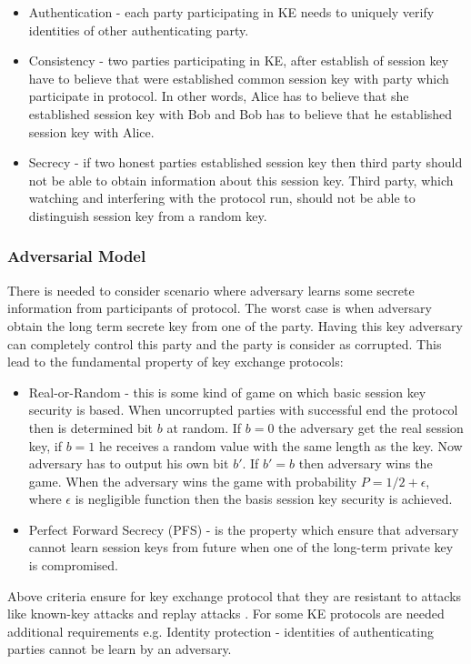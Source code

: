 \documentclass[11pt,titlepage]{article}
\theoremstyle{plain}
\begin{document}
\begin{itemize}
\item Authentication - each party participating in KE needs to uniquely verify identities of other authenticating party.
\item Consistency - two parties participating in KE, after establish of session key have to believe that were established common session key with party which participate in protocol. In other words, Alice has to believe that she established session key with Bob and Bob has to believe that he established session key with Alice.
\item Secrecy - if two honest parties established session key then third party should not be able to obtain information about this session key. Third party, which watching and interfering with the protocol run, should not be able to distinguish session key from a random key.
\end{itemize}

\subsubsection{Adversarial Model}
There is needed to consider scenario where adversary learns some secrete information from participants of protocol. The worst case is when adversary obtain the long term secrete key from one of the party. Having this key adversary can completely control this party and the party is consider as corrupted. This lead to the fundamental property of key exchange protocols:

\begin{itemize}
\item Real-or-Random - this is some kind of game on which basic session key security is based. When uncorrupted parties with successful end the protocol then is determined bit $b$ at random. If $b=0$ the adversary get the real session key, if $b = 1$ he receives a random value with the same length as the key. Now adversary has to output his own bit $b'$. If $b' = b$ then adversary wins the game. When the adversary wins the game with probability $P = 1/2+\epsilon$, where $\epsilon$ is negligible function then the basis session key security is achieved.
\item Perfect Forward Secrecy (PFS) - is the property which ensure that adversary cannot learn session keys from future when one of the long-term private key is compromised.
\end{itemize}

Above criteria ensure for key exchange protocol that they are resistant to attacks like known-key attacks and replay attacks \cite{cryptography}. For some KE protocols are needed additional requirements e.g. Identity protection - identities of authenticating parties cannot be learn by an adversary.
\end{document}
